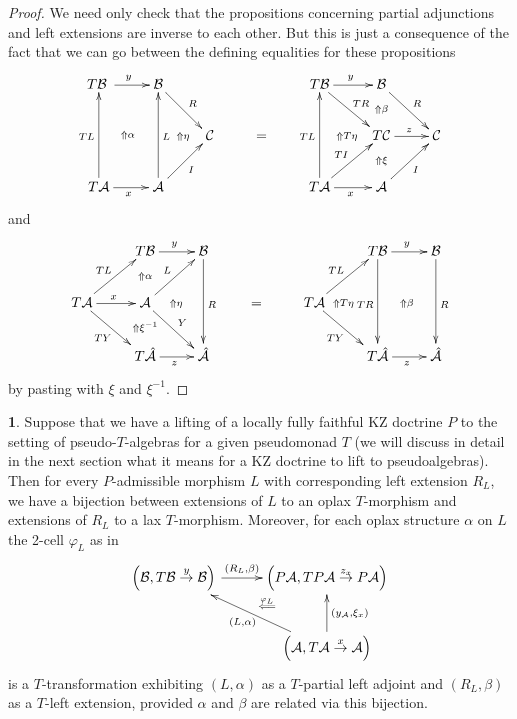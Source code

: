 \documentclass[a4paper,oneside,english]{amsart}
\numberwithin{equation}{section}
\numberwithin{figure}{section}
\theoremstyle{plain}
\theoremstyle{definition}
\theoremstyle{remark}
\theoremstyle{definition}
\newtheorem{example}[thm]{\protect\examplename}
\theoremstyle{plain}
\theoremstyle{plain}
\theoremstyle{plain}
\providecommand{\examplename}{Example}
\begin{document}
\begin{proof}
We need only check that the propositions concerning partial adjunctions
and left extensions are inverse to each other. But this is just a
consequence of the fact that we can go between the defining equalities
for these propositions
\[
\xymatrix{T\mathcal{B}\ar[r]^{y}\;\ar@{}[rdd]|-{\Uparrow\alpha} & \mathcal{B}\ar[rd]^{R} &  &  & T\mathcal{B}\ar[r]^{y}\ar[dr]^{TR} & \mathcal{B}\ar[rd]^{R}\ar@{}[d]|-{\Uparrow\beta}\\
 & \;\ar@{}[r]|-{\Uparrow\eta} & \mathcal{C} & = & \;\ar@{}[r]|-{\Uparrow T\eta} & T\mathcal{C}\ar[r]^{z}\ar@{}[d]|-{\Uparrow\xi} & \mathcal{C}\\
T\mathcal{A}\ar[r]_{x}\ar[uu]^{TL} & \mathcal{A}\ar[uu]_{L}\ar[ur]_{I} &  &  & T\mathcal{A}\ar[r]_{x}\ar[uu]^{TL}\ar[ur]^{TI} & \mathcal{A}\ar[ur]_{I}
}
\]
and
\[
\xymatrix{ & T\mathcal{B}\ar[r]^{y} & \mathcal{B}\ar[dd]^{R} &  &  & T\mathcal{B}\ar[r]^{y}\ar[dd]_{TR} & \mathcal{B}\ar[dd]^{R}\\
T\mathcal{A}\ar[ru]^{TL}\ar[r]^{x}\ar[rd]_{TY} & \mathcal{A}\ar[dr]^{Y}\ar[ur]^{L}\ar@{}[r]|-{\Uparrow\eta}\ar@{}[u]|-{\Uparrow\alpha}\ar@{}[d]|-{\Uparrow\xi^{-1}} & \; & = & T\mathcal{A}\ar[ru]^{TL}\ar[rd]_{TY}\ar@{}[r]|-{\Uparrow T\eta\quad} & \;\ar@{}[r]|-{\Uparrow\beta} & \;\\
 & T\hat{\mathcal{A}}\ar[r]_{z} & \hat{\mathcal{A}} &  &  & T\hat{\mathcal{A}}\ar[r]_{z} & \hat{\mathcal{A}}
}
\]
by pasting with $\xi$ and $\xi^{-1}$.\end{proof}
\begin{example}
Suppose that we have a lifting of a locally fully faithful KZ doctrine
$P$ to the setting of pseudo-$T$-algebras for a given pseudomonad
$T$ (we will discuss in detail in the next section what it means
for a KZ doctrine to lift to pseudoalgebras). Then for every $P$-admissible
morphism $L$ with corresponding left extension $R_{L}$, we have
a bijection between extensions of $L$ to an oplax $T$-morphism and
extensions of $R_{L}$ to a lax $T$-morphism. Moreover, for each
oplax structure $\alpha$ on $L$ the 2-cell $\varphi_{L}$ as in
\[
\xymatrix@=1em{\left(\mathcal{B},T\mathcal{B}\overset{y}{\rightarrow}\mathcal{B}\right){\ar^-{{\left(R_{L},\beta\right)}}[{rr}]} &  & \left(P\mathcal{A},TP\mathcal{A}\overset{z_{x}}{\rightarrow}P\mathcal{A}\right)\ar@{}[ld]|-{\stackrel{\varphi_{L}}{\Longleftarrow}}\\
 & \;\\
 &  & \left(\mathcal{A},T\mathcal{A}\overset{x}{\rightarrow}\mathcal{A}\right)\ar[uu]_{\left(y_{\mathcal{A}},\xi_{x}\right)}\ar[uull]^{\left(L,\alpha\right)}
}
\]
is a $T$-transformation exhibiting $\left(L,\alpha\right)$ as a
$T$-partial left adjoint and $\left(R_{L},\beta\right)$ as a $T$-left
extension, provided $\alpha$ and $\beta$ are related via this bijection.
\end{example}
\end{document}
